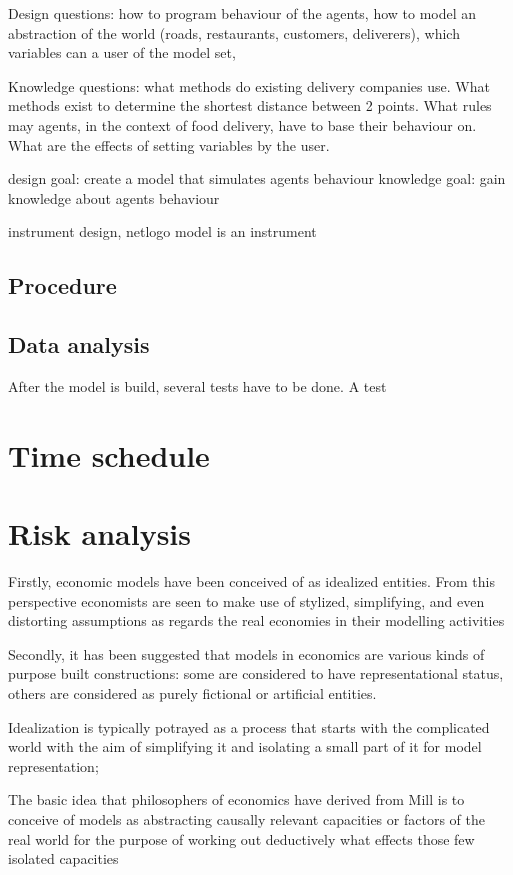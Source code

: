 Design questions: how to program behaviour of the agents, how to model an abstraction of the world (roads, restaurants, customers, deliverers),
which variables can a user of the model set,

Knowledge questions: what methods do existing delivery companies use.
What methods exist to determine the shortest distance between 2 points.
What rules may agents, in the context of food delivery, have to base their behaviour on.
What are the effects of setting variables by the user.

design goal: create a model that simulates agents behaviour
knowledge goal: gain knowledge about agents behaviour

instrument design, netlogo model is an instrument
\subsection{Procedure}

\subsection{Data analysis}
After the model is build, several tests have to be done.
A test

\section{Time schedule}


\section{Risk analysis}










Firstly, economic models have been conceived of as idealized entities.
From this perspective economists are seen to make use of stylized, simplifying,
and even distorting assumptions as regards the real economies in their modelling
activities

Secondly, it has been suggested that models in economics are various
kinds of purpose built constructions: some are considered to have representational
status, others are considered as purely fictional or artificial entities.



Idealization is typically potrayed as a process that starts
with the complicated world with the aim of simplifying it and isolating a small part
of it for model representation;

The basic idea that philosophers of economics have derived from Mill is to conceive
of models as abstracting causally relevant capacities or factors of the real world for
the purpose of working out deductively what effects those few isolated capacities
